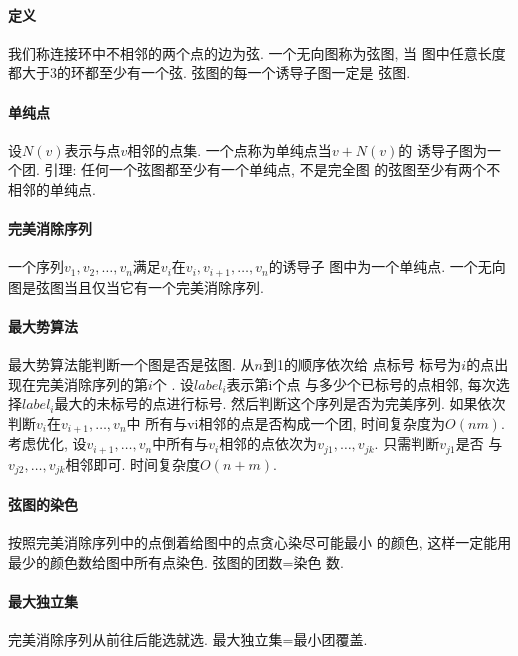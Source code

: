 \paragraph{定义} 我们称连接环中不相邻的两个点的边为弦. 一个无向图称为弦图, 当
图中任意长度都大于3的环都至少有一个弦. 弦图的每一个诱导子图一定是
弦图.

\paragraph{单纯点} 设$N(v)$表示与点$v$相邻的点集. 一个点称为单纯点当$v+N(v)$的
诱导子图为一个团. 引理: 任何一个弦图都至少有一个单纯点, 不是完全图
的弦图至少有两个不相邻的单纯点.

\paragraph{完美消除序列}	一个序列$v_1, v_2, \dots, v_n$满足$v_i$在$v_i, v_{i+1}, \dots, v_n$的诱导子
图中为一个单纯点. 一个无向图是弦图当且仅当它有一个完美消除序列.

\paragraph{最大势算法} 最大势算法能判断一个图是否是弦图. 从$n$到1的顺序依次给
点标号 标号为$i$的点出现在完美消除序列的第$i$个 . 设$label_i$表示第i个点
与多少个已标号的点相邻, 每次选择$label_i$最大的未标号的点进行标号.
然后判断这个序列是否为完美序列. 如果依次判断$v_i$在$v_{i+1}, \dots, v_n$中
所有与vi相邻的点是否构成一个团, 时间复杂度为$O(nm)$. 考虑优化,
设$v_{i+1}, \dots, v_n$中所有与$v_i$相邻的点依次为$v_{j1},\dots,v_{jk}$. 只需判断$v_{j1}$是否
与$v_{j2},\dots,v_{jk}$相邻即可. 时间复杂度$O(n + m)$.

\paragraph{弦图的染色} 按照完美消除序列中的点倒着给图中的点贪心染尽可能最小
的颜色, 这样一定能用最少的颜色数给图中所有点染色. 弦图的团数=染色
数.

\paragraph{最大独立集} 完美消除序列从前往后能选就选. 最大独立集=最小团覆盖.

